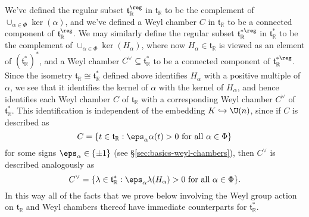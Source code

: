 \documentclass[reqno]{amsart} 
\begin{document}
We've defined the regular subset $\mathfrak{t}_{\mathbb{R}}^{\reg}$ in $\mathfrak{t}_{\mathbb{R}}$ to be the complement of $\cup_{\alpha \in \Phi} \ker(\alpha)$, and we've defined a Weyl chamber $C$ in $\mathfrak{t}_{\mathbb{R}}$ to be a connected component of $\mathfrak{t}_{\mathbb{R}}^{\reg}$.  We may similarly define the regular subset $\mathfrak{t}_{\mathbb{R}}^{* \reg}$ in $\mathfrak{t}_{\mathbb{R}}^*$ to be the complement of $\cup_{\alpha \in \Phi} \ker(H_\alpha)$, where now $H_\alpha \in \mathfrak{t}_{\mathbb{R}}$ is viewed as an element of $(\mathfrak{t}_{\mathbb{R}}^*)^*$, and a Weyl chamber $C^\vee \subseteq \mathfrak{t}_{\mathbb{R}}^*$ to be a connected component of $\mathfrak{t}_{\mathbb{R}}^{*\reg}$.  Since the isometry $\mathfrak{t}_{\mathbb{R}} \cong \mathfrak{t}_{\mathbb{R}}^*$ defined above identifies $H_\alpha$ with a positive multiple of $\alpha$, we see that it identifies the kernel of $\alpha$ with the kernel of $H_\alpha$, and hence identifies each Weyl chamber $C$ of $\mathfrak{t}_{\mathbb{R}}$ with a corresponding Weyl chamber $C^\vee$ of $\mathfrak{t}_{\mathbb{R}}^*$.  This identification is independent of the embedding $K \hookrightarrow \U(n)$, since if $C$ is described as
\begin{equation*}
  C = \{t  \in \mathfrak{t}_{\mathbb{R}} : \eps_\alpha \alpha(t) > 0 \text{ for all } \alpha \in
  \Phi  \}
\end{equation*}
for some signs $\eps_\alpha \in \{\pm 1\}$ (see \S\ref{sec:basics-weyl-chambers}), then $C^\vee$ is described analogously as
\begin{equation*}
  C^\vee
  = \{\lambda
  \in \mathfrak{t}_{\mathbb{R}}^*
  : \eps_\alpha
  \lambda(H_\alpha) > 0 \text{ for all } \alpha \in
  \Phi  \}.
\end{equation*}
In this way all of the facts that we prove below involving the Weyl group action on $\mathfrak{t}_{\mathbb{R}}$ and Weyl chambers thereof have immediate counterparts for $\mathfrak{t}_{\mathbb{R}}^*$.
\end{document}
